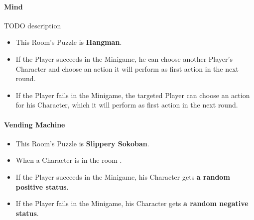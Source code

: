 \paragraph{Mind} TODO description
\begin{itemize}
	\item This Room's Puzzle is \textbf{Hangman}.
	\item If the Player succeeds in the Minigame, he can choose another Player's Character and choose an action it will perform as first action in the next round.
	\item If the Player fails    in the Minigame, the targeted Player can choose an action for his Character, which it will perform as first action in the next round.
\end{itemize}

\paragraph{Vending Machine} 
\begin{itemize}
	\item This Room's Puzzle is \textbf{Slippery Sokoban}.
	\item When a Character is in the room .
	\item If the Player succeeds in the Minigame, his Character gets \textbf{a random positive status}.
	\item If the Player fails    in the Minigame, his Character gets \textbf{a random negative status}.
\end{itemize}



\pagebreak